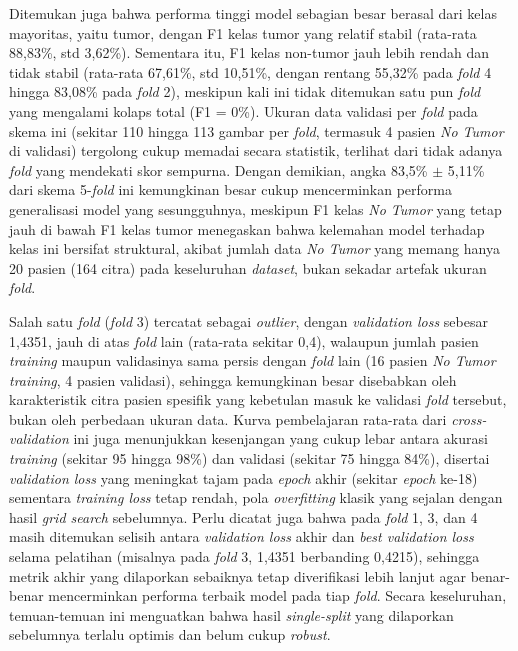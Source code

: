 Ditemukan juga bahwa performa tinggi model sebagian besar berasal dari kelas mayoritas, yaitu tumor, dengan F1 kelas tumor yang relatif stabil (rata-rata 88,83\%, std 3,62\%). Sementara itu, F1 kelas non-tumor jauh lebih rendah dan tidak stabil (rata-rata 67,61\%, std 10,51\%, dengan rentang 55,32\% pada \textit{fold} 4 hingga 83,08\% pada \textit{fold} 2), meskipun kali ini tidak ditemukan satu pun \textit{fold} yang mengalami kolaps total (F1 = 0\%). Ukuran data validasi per \textit{fold} pada skema ini (sekitar 110 hingga 113 gambar per \textit{fold}, termasuk 4 pasien \textit{No Tumor} di validasi) tergolong cukup memadai secara statistik, terlihat dari tidak adanya \textit{fold} yang mendekati skor sempurna. Dengan demikian, angka 83,5\% $\pm$ 5,11\% dari skema 5-\textit{fold} ini kemungkinan besar cukup mencerminkan performa generalisasi model yang sesungguhnya, meskipun F1 kelas \textit{No Tumor} yang tetap jauh di bawah F1 kelas tumor menegaskan bahwa kelemahan model terhadap kelas ini bersifat struktural, akibat jumlah data \textit{No Tumor} yang memang hanya 20 pasien (164 citra) pada keseluruhan \textit{dataset}, bukan sekadar artefak ukuran \textit{fold}.

Salah satu \textit{fold} (\textit{fold} 3) tercatat sebagai \textit{outlier}, dengan \textit{validation loss} sebesar 1,4351, jauh di atas \textit{fold} lain (rata-rata sekitar 0,4), walaupun jumlah pasien \textit{training} maupun validasinya sama persis dengan \textit{fold} lain (16 pasien \textit{No Tumor} \textit{training}, 4 pasien validasi), sehingga kemungkinan besar disebabkan oleh karakteristik citra pasien spesifik yang kebetulan masuk ke validasi \textit{fold} tersebut, bukan oleh perbedaan ukuran data. Kurva pembelajaran rata-rata dari \textit{cross-validation} ini juga menunjukkan kesenjangan yang cukup lebar antara akurasi \textit{training} (sekitar 95 hingga 98\%) dan validasi (sekitar 75 hingga 84\%), disertai \textit{validation loss} yang meningkat tajam pada \textit{epoch} akhir (sekitar \textit{epoch} ke-18) sementara \textit{training loss} tetap rendah, pola \textit{overfitting} klasik yang sejalan dengan hasil \textit{grid search} sebelumnya. Perlu dicatat juga bahwa pada \textit{fold} 1, 3, dan 4 masih ditemukan selisih antara \textit{validation loss} akhir dan \textit{best validation loss} selama pelatihan (misalnya pada \textit{fold} 3, 1,4351 berbanding 0,4215), sehingga metrik akhir yang dilaporkan sebaiknya tetap diverifikasi lebih lanjut agar benar-benar mencerminkan performa terbaik model pada tiap \textit{fold}. Secara keseluruhan, temuan-temuan ini menguatkan bahwa hasil \textit{single-split} yang dilaporkan sebelumnya terlalu optimis dan belum cukup \textit{robust}.

